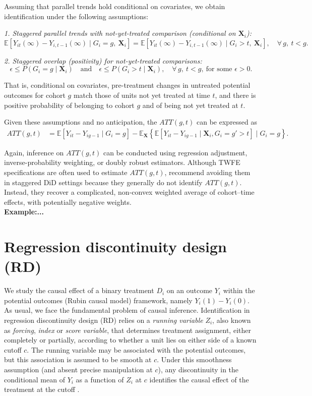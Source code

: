 Assuming that parallel trends hold conditional on covariates, we obtain identification under the following assumptions:

\textit{1. Staggered parallel trends with not-yet-treated comparison (conditional on $\mathbf X_i$):}
\[
\mathbb{E}\!\left[Y_{it}(\infty)-Y_{i,t-1}(\infty)\mid G_i=g,\ \mathbf X_i\right]
=
\mathbb{E}\!\left[Y_{it}(\infty)-Y_{i,t-1}(\infty)\mid G_i>t,\ \mathbf X_i\right],
\quad \forall\, g,\ t<g.
\]

\textit{2. Staggered overlap (positivity) for not-yet-treated comparisons:}
\[
\epsilon \le P(G_i=g \mid \mathbf X_i)
\quad \text{and} \quad
\epsilon \le P(G_i>t \mid \mathbf X_i),
\quad \forall\, g,\ t<g,\ \text{for some } \epsilon>0.
\]

That is, conditional on covariates, pre-treatment changes in untreated potential outcomes for cohort $g$ match those of units not yet treated at time $t$, and there is positive probability of belonging to cohort $g$ and of being not yet treated at $t$.

Given these assumptions and no anticipation, the $ATT(g,t)$ can be expressed as
\begin{align*}
	ATT(g,t) &=\mathbb{E}[Y_{it} - Y_{ig-1} \mid G_i = g]-\mathbb{E}_{\mathbf{X}}\left\{\mathbb{E}[Y_{it} - Y_{ig-1} \mid\mathbf{X}_i,  G_i = g'>t]\mid G_i=g\right\}.
\end{align*}

Again, inference on $ATT(g,t)$ can be conducted using regression adjustment, inverse-probability weighting, or doubly robust estimators. Although TWFE specifications are often used to estimate $ATT(g,t)$, \cite{baker2025did_guide} recommend avoiding them in staggered DiD settings because they generally do not identify $ATT(g,t)$. Instead, they recover a complicated, non-convex weighted average of cohort–time effects, with potentially negative weights.\\

\textbf{Example:...}


\section{Regression discontinuity design (RD)}\label{chap12_7}

We study the causal effect of a binary treatment $D_i$ on an outcome $Y_i$ within the potential outcomes (Rubin causal model) framework, namely $Y_i(1)-Y_i(0)$. As usual, we face the fundamental problem of causal inference. Identification in regression discontinuity design (RD) relies on a \textit{running variable} $Z_i$, also known as \textit{forcing}, \textit{index} or \textit{score variable}, that determines treatment assignment, either completely or partially, according to whether a unit lies on either side of a known cutoff $c$. The running variable may be associated with the potential outcomes, but this association is assumed to be smooth at $c$. Under this smoothness assumption (and absent precise manipulation at $c$), any discontinuity in the conditional mean of $Y_i$ as a function of $Z_i$ at $c$ identifies the causal effect of the treatment at the cutoff \cite{imbens2008regression}.

